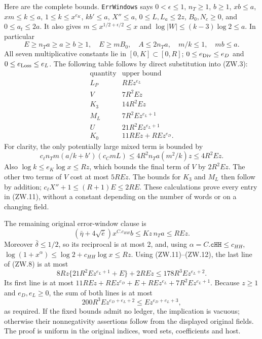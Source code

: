 Here are the complete bounds.  \texttt{ErrWindows} says
$0<\epsilon\le1$, $n_T\ge1$, $b\ge1$, $xb\le a$,
$xm\le k\le a$, $1\le k\le x^{e_K}$, $kb'\le a$, $X''\le a$,
$0\le L,L_a\le2z$, $B_0,N_c\ge0$, and $0\le a_t\le2a$.
It also gives $m\le x^{1/2+\epsilon/2}\le x$ and
$\log|W|\le(k-3)\log2\le a$.
In particular
\[
 E\ge n_Ta\ge a\ge b\ge1,\quad E\ge mB_0,\quad
 A\le2n_Ta,\quad m/k\le1,\quad mb\le a.                         \tag{ZW.10}
\]
All seven multiplicative constants lie in $[0,K]\subset[0,R]$;
$0\le e_{\rm Div}\le e_D$ and $0\le e_{\rm Loss}\le e_L$.
The following table follows by direct substitution into (ZW.3):
\[
\begin{array}{c|l}
\text{quantity}&\text{upper bound}\\ \hline
 L_P&R E z^{e_L}\\
 V&7R^2 E z\\
 K_3&14R^2 E z\\
 M_L&7R^2 E z^{e_L+1}\\
 U&21R^2 E z^{e_L+1}\\
 K_0&11R E z+R E z^{e_D}.
\end{array}                                                       \tag{ZW.11}
\]
For clarity, the only potentially large mixed term is bounded by
\[
 c_\ell n_Tm(a/k+b')(c_CmL)
              \le4R^2 n_Ta(m^2/k)z\le4R^2Ez.
\]
Also $\log k\le e_K\log x\le Rz$, which bounds the final term
of $V$ by $2R^2Ez$.  The other two terms of $V$ cost at most
$5REz$.  The bounds for $K_3$ and $M_L$ then follow by addition;
$c_\ell X''+1\le(R+1)E\le2RE$.
These calculations prove every entry in (ZW.11), without a constant
depending on the number of words or on a changing field.

The remaining original error-window clause is
\[
 (\bar\eta+4\sqrt{\bar e})x^{C.c_{HH}}b
                         \le Kz\,n_Ta\le REz.                  \tag{ZW.12}
\]
Moreover $\bar\delta\le1/2$, so its reciprocal is at most $2$,
and, using $\alpha=C.\texttt{cHH}\le c_{HH}$,
$\log(1+x^\alpha)\le\log2+c_{HH}\log x\le Rz$.
Using (ZW.11)--(ZW.12), the last line of (ZW.8) is at most
\[
 8Rz\{21R^2Ez^{e_L+1}+E\}+2REz
                         \le178R^3Ez^{e_L+2}.
\]
Its first line is at most
$11REz+REz^{e_D}+E+REz^{e_L}+7R^2Ez^{e_L+1}$.
Because $z\ge1$ and $e_D,e_L\ge0$, the sum of both lines is
at most
\[
 200R^3 E z^{e_D+e_L+2}\le E z^{e_D+e_L+3},
\]
as required.  If the fixed bounds admit no ledger, the implication is
vacuous; otherwise their nonnegativity assertions follow from the
displayed original fields.  The proof is uniform in the original
indices, word sets, coefficients and host.

